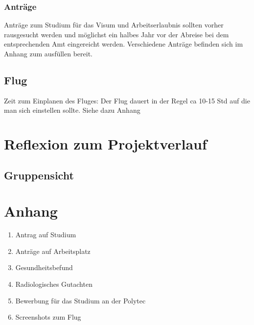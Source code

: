 \documentclass[11pt]{article}
\begin{document}
\subsubsection{Anträge}
Anträge zum Studium für das Visum und Arbeitserlaubnis sollten vorher rausgesucht werden und möglichst ein halbes Jahr vor der Abreise bei dem entsprechenden Amt eingereicht werden. Verschiedene Anträge befinden sich im Anhang zum ausfüllen bereit.

\subsection{Flug}
Zeit zum Einplanen des Fluges: Der Flug dauert in der Regel ca 10-15 Std auf die man sich einstellen sollte.
Siehe dazu Anhang

\section{Reflexion zum Projektverlauf}

\subsection{Gruppensicht}
\section{Anhang}
\begin{enumerate}
\item Antrag auf Studium
\item Anträge auf Arbeitsplatz
\item Gesundheitsbefund
\item Radiologisches Gutachten
\item Bewerbung für das Studium an der Polytec
\item Screenshots zum Flug
\end{enumerate}








\end{document}
